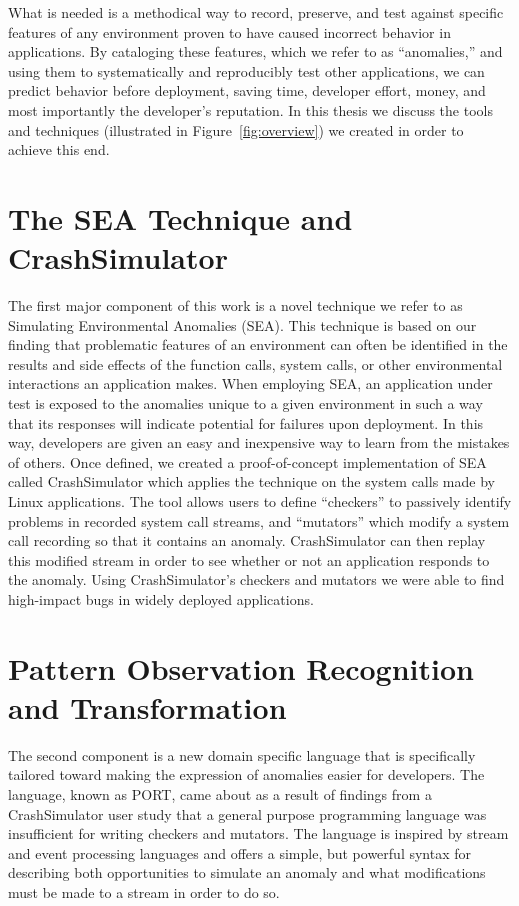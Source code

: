 What is needed is a methodical way to record, preserve, and test against
specific features of any environment proven to have caused incorrect
behavior in applications.
By cataloging these features,
which we refer to as ``anomalies,'' and using them to systematically and reproducibly test other applications, we can predict behavior before deployment, saving time, developer effort, money, and most importantly the developer's reputation.
In this thesis we discuss the tools and techniques (illustrated in Figure~\ref{fig:overview}) we created in order to achieve this end.

\section{The SEA Technique and CrashSimulator}
The first major component of this work is a novel technique we refer to as Simulating Environmental Anomalies (SEA).
This technique is based on our finding that problematic features of an environment can often be identified in the results and side effects of the function calls, system calls, or other environmental interactions an application makes. When employing SEA,
an application under test is exposed
to the anomalies unique to a given environment
in such a way that its responses will indicate
potential for failures upon deployment. In this way, developers are given
an easy and inexpensive way to learn from the mistakes of others.
Once defined,
we created a proof-of-concept implementation of SEA called CrashSimulator which applies the technique on the system calls made by Linux applications.
The tool allows users to define ``checkers''
to passively identify problems in recorded system call streams,
and ``mutators'' which modify a system call recording so that it contains an anomaly.
CrashSimulator can then replay this modified stream in order to see whether or not
an application responds to the anomaly.
Using CrashSimulator's checkers and mutators we were able to find high-impact bugs in widely deployed applications.

\section{Pattern Observation Recognition and Transformation}
The second component is a new domain specific language that is specifically tailored toward making the expression of anomalies easier for developers.
The language,
known as PORT,
came about as a result of findings from a CrashSimulator user study that a general purpose programming language was insufficient for writing checkers and mutators.
The language is inspired by stream and event processing languages and offers a simple,
but powerful syntax for describing both opportunities to simulate an anomaly and what modifications must be made to a stream in order to do so.

